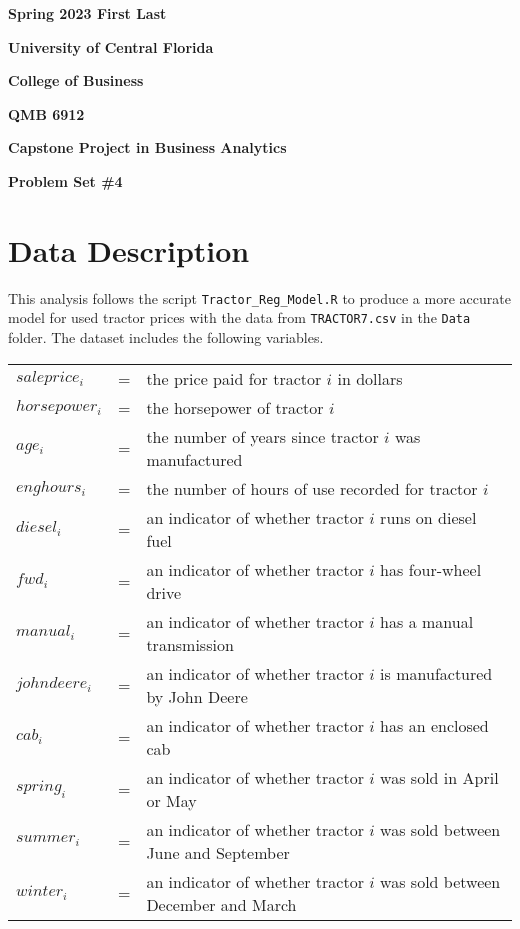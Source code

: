 \documentclass[11pt]{article}
\begin{document}

{\noindent\bf Spring 2023 \hfill First Last}
\vskip 16pt
\centerline{\bf University of Central Florida}
\centerline{\bf College of Business }
\vskip 16pt
\centerline{\bf QMB 6912}
\centerline{\bf Capstone Project in Business Analytics}
\vskip 10pt
\centerline{\bf Problem Set \#4}
\vskip 32pt
\noindent
% 
\section{Data Description}

This analysis follows the script \texttt{Tractor\_Reg\_Model.R} to produce a more accurate model for used tractor prices with the data from \texttt{TRACTOR7.csv} in the \texttt{Data} folder. 
The dataset includes the following variables.
\begin{table}[h!]
\begin{tabular}{l l l}

$saleprice_i$ & = & the price paid for tractor $i$ in dollars \\
% 
$horsepower_i$ & = & the horsepower of tractor $i$ \\
$age_i$ & = & the number of years since tractor $i$ was manufactured  \\
$enghours_i$ & = & the number of hours of use recorded for tractor $i$  \\
$diesel_i$ & = & an indicator of whether tractor $i$ runs on diesel fuel \\ %
$fwd_i$ & = & an indicator of whether tractor $i$ has four-wheel drive \\ %
$manual_i$ & = & an indicator of whether tractor $i$ has a manual transmission \\ %
$johndeere_i$ & = & an indicator of whether tractor $i$ is manufactured by John Deere \\ %
$cab_i$ & = & an indicator of whether tractor $i$ has an enclosed cab \\ %
% 
$spring_i$ & = & an indicator of whether tractor $i$ was sold in April or May \\ %
$summer_i$ & = & an indicator of whether tractor $i$ was sold between June and September \\ %
$winter_i$ & = & an indicator of whether tractor $i$ was sold between December and March \\ %

\end{tabular}
\end{table}
%
\end{document}
